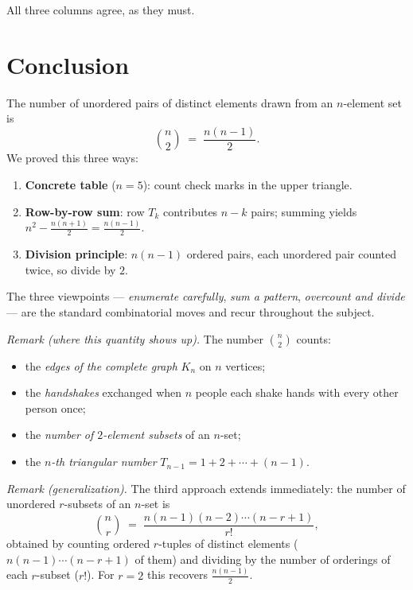 \documentclass[11pt]{article}
\begin{document}
All three columns agree, as they must.

\section*{Conclusion}

\begin{tcolorbox}[conclbox, title=Summary]
The number of unordered pairs of distinct elements drawn from an $n$-element set is
\[
  \binom{n}{2} \;=\; \frac{n(n-1)}{2}.
\]
We proved this three ways:
\begin{enumerate}
  \item \textbf{Concrete table} ($n=5$): count check marks in the upper triangle.
  \item \textbf{Row-by-row sum}: row $T_k$ contributes $n-k$ pairs; summing yields $n^2 - \tfrac{n(n+1)}{2} = \tfrac{n(n-1)}{2}$.
  \item \textbf{Division principle}: $n(n-1)$ ordered pairs, each unordered pair counted twice, so divide by $2$.
\end{enumerate}
The three viewpoints — \emph{enumerate carefully}, \emph{sum a pattern}, \emph{overcount and divide} — are the standard combinatorial moves and recur throughout the subject.
\end{tcolorbox}

\vspace{6pt}
\noindent\textit{Remark (where this quantity shows up).} The number $\binom{n}{2}$ counts:
\begin{itemize}
  \item the \emph{edges of the complete graph} $K_n$ on $n$ vertices;
  \item the \emph{handshakes} exchanged when $n$ people each shake hands with every other person once;
  \item the \emph{number of $2$-element subsets} of an $n$-set;
  \item the \emph{$n$-th triangular number} $T_{n-1} = 1 + 2 + \cdots + (n-1)$.
\end{itemize}

\noindent\textit{Remark (generalization).} The third approach extends immediately: the number of unordered $r$-subsets of an $n$-set is
\[
  \binom{n}{r} \;=\; \frac{n(n-1)(n-2)\cdots(n-r+1)}{r!},
\]
obtained by counting ordered $r$-tuples of distinct elements ($n(n-1)\cdots(n-r+1)$ of them) and dividing by the number of orderings of each $r$-subset ($r!$). For $r=2$ this recovers $\tfrac{n(n-1)}{2}$.
\end{document}
